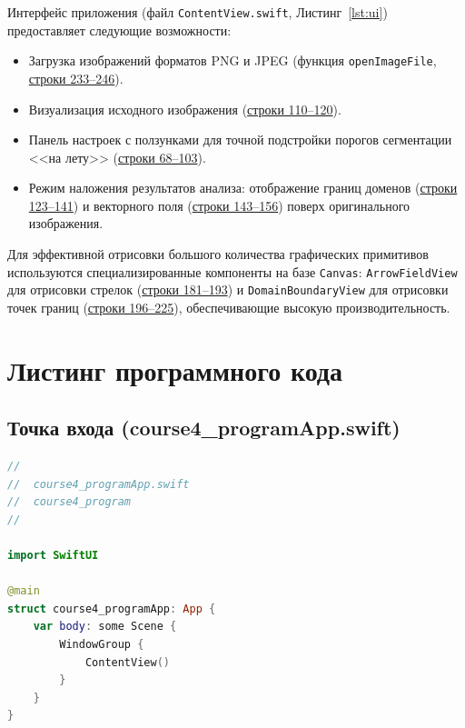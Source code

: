 \documentclass[12pt,a4paper]{article}
\numberwithin{equation}{section}
\begin{document}
Интерфейс приложения (файл \texttt{ContentView.swift}, Листинг~\ref{lst:ui}) предоставляет следующие возможности:
\begin{itemize}
    \item Загрузка изображений форматов PNG и JPEG (функция \texttt{openImageFile}, \hyperref[ui:openfile]{строки 233--246}).
    \item Визуализация исходного изображения (\hyperref[ui:original]{строки 110--120}).
    \item Панель настроек с ползунками для точной подстройки порогов сегментации <<на лету>> (\hyperref[ui:sliders]{строки 68--103}).
    \item Режим наложения результатов анализа: отображение границ доменов (\hyperref[ui:boundaries]{строки 123--141}) и векторного поля (\hyperref[ui:vectorfield]{строки 143--156}) поверх оригинального изображения.
\end{itemize}
Для эффективной отрисовки большого количества графических примитивов используются специализированные компоненты на базе \texttt{Canvas}: \texttt{ArrowFieldView} для отрисовки стрелок (\hyperref[ui:arrowfield]{строки 181--193}) и \texttt{DomainBoundaryView} для отрисовки точек границ (\hyperref[ui:domainboundary]{строки 196--225}), обеспечивающие высокую производительность.

\newpage
\section{Листинг программного кода} \label{sec:code_listing}

\subsection{Точка входа (course4\_programApp.swift)}
\begin{lstlisting}[language=Swift, caption=Точка входа в приложение, label=lst:main]
//
//  course4_programApp.swift
//  course4_program
//

import SwiftUI

@main
struct course4_programApp: App {
    var body: some Scene {
        WindowGroup {
            ContentView()
        }
    }
}
\end{lstlisting}
\end{document}
